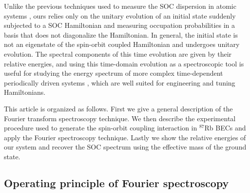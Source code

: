 Unlike the previous techniques used to measure the SOC dispersion in atomic systems \cite{cheuk_spin-injection_2012}, ours relies only on the unitary evolution of an initial state suddenly subjected to a SOC Hamiltonian and measuring occupation probabilities in a basis that does not diagonalize the Hamiltonian. In general, the initial state is not an eigenstate of the spin-orbit coupled Hamiltonian and undergoes unitary evolution. The spectral components of this time evolution are given by their relative energies, and using this time-domain evolution as a spectroscopic tool is useful for studying the energy spectrum of more complex time-dependent periodically driven systems \cite{jimenez-garcia_tunable_2015,eckardt_superfluid-insulator_2005,goldman_periodically_2014}, which are well suited for engineering and tuning Hamiltonians.

This article is organized as follows. First we give a general description of the Fourier transform spectroscopy technique. We then describe the experimental procedure used to generate the spin-orbit coupling interaction in $^{87}$Rb BECs and apply the Fourier spectroscopy technique. Lastly we show the relative energies of our system and recover the SOC spectrum using the effective mass of the ground state. 

\subsection*{Operating principle of Fourier spectroscopy}


